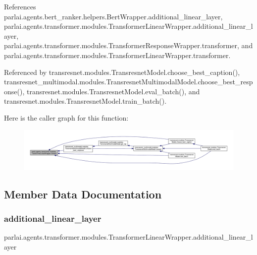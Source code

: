 References parlai.\+agents.\+bert\+\_\+ranker.\+helpers.\+Bert\+Wrapper.\+additional\+\_\+linear\+\_\+layer, parlai.\+agents.\+transformer.\+modules.\+Transformer\+Linear\+Wrapper.\+additional\+\_\+linear\+\_\+layer, parlai.\+agents.\+transformer.\+modules.\+Transformer\+Response\+Wrapper.\+transformer, and parlai.\+agents.\+transformer.\+modules.\+Transformer\+Linear\+Wrapper.\+transformer.



Referenced by transresnet.\+modules.\+Transresnet\+Model.\+choose\+\_\+best\+\_\+caption(), transresnet\+\_\+multimodal.\+modules.\+Transresnet\+Multimodal\+Model.\+choose\+\_\+best\+\_\+response(), transresnet.\+modules.\+Transresnet\+Model.\+eval\+\_\+batch(), and transresnet.\+modules.\+Transresnet\+Model.\+train\+\_\+batch().

Here is the caller graph for this function\+:
\nopagebreak
\begin{figure}[H]
\begin{center}
\leavevmode
\includegraphics[width=350pt]{classparlai_1_1agents_1_1transformer_1_1modules_1_1TransformerLinearWrapper_a82f571e85719bde36f8fcf09f27d3e4c_icgraph}
\end{center}
\end{figure}


\subsection{Member Data Documentation}
\mbox{\label{classparlai_1_1agents_1_1transformer_1_1modules_1_1TransformerLinearWrapper_af083195926e1f091010ecb4c6d409a2a}} 
\subsubsection{\texorpdfstring{additional\+\_\+linear\+\_\+layer}{additional\_linear\_layer}}
{\footnotesize\ttfamily parlai.\+agents.\+transformer.\+modules.\+Transformer\+Linear\+Wrapper.\+additional\+\_\+linear\+\_\+layer}



